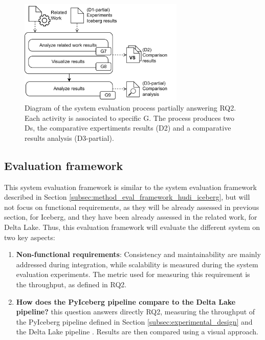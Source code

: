 \begin{figure}[!ht]
    \begin{center}
    \includegraphics[width=0.7\textwidth]{figures/3-method/method_comp.png}
    \caption[System evaluation process - Iceberg vs. Delta Lake]{Diagram of the system evaluation process partially answering \gls{RQ}2. Each activity is associated to specific \gls{G}. The process produces two \glspl{D}, the comparative expertiments results (\gls{D}2) and a comparative results analysis (\gls{D}3-partial).}
    \label{fig:method_comparison}
    \end{center}
\end{figure}



\subsection{Evaluation framework}
\label{subsec:method_eval_framework_iceberg_delta}

This system evaluation framework is similar to the system evaluation framework described in Section \ref{subsec:method_eval_framework_hudi_iceberg}, but will not focus on functional requirements, as they will be already assessed in previous section, for Iceberg, and they have been already assessed in the related work, for Delta Lake. Thus, this evaluation framework will evaluate the different system on two key aspects:
\begin{enumerate}
    \item \textbf{Non-functional requirements}: Consistency and maintainability are mainly addressed during integration, while scalability is measured during the system evaluation experiments. The metric used for measuring this requirement is the throughput, as defined in \gls{RQ}2.
    \item \textbf{How does the PyIceberg pipeline compare to the Delta Lake pipeline?} this question answers directly \gls{RQ}2, measuring the throughput of the PyIceberg pipeline defined in Section \ref{subsec:experimental_design} and the Delta Lake pipeline \cite{manfrediReducingReadWrite2024}. Results are then compared using a visual approach.
\end{enumerate}


